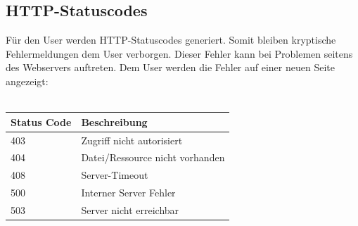 	\subsection{HTTP-Statuscodes}
	Für den User werden HTTP-Statuscodes generiert. Somit bleiben kryptische Fehlermeldungen dem User verborgen. Dieser Fehler kann bei Problemen seitens des Webservers auftreten. Dem User werden die Fehler auf einer neuen Seite angezeigt: \\ \\
	\begin{tabular}{|l|l|}
		\hline
		Status Code & Beschreibung \\
		\hline
		403 & Zugriff nicht autorisiert \\
		404 & Datei/Ressource nicht vorhanden \\
		408 & Server-Timeout \\
		500 & Interner Server Fehler \\
		503 & Server nicht erreichbar \\
		\hline
 	\end{tabular}		     

